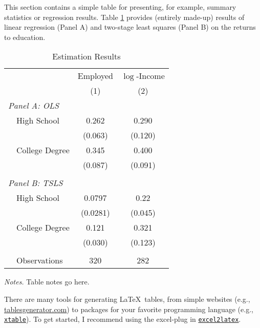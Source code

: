 This section contains a simple table for presenting, for example, summary statistics or regression results. Table \ref{pset1:tab_estres} provides (entirely made-up) results of linear regression (Panel A) and two-stage least squares (Panel B) on the returns to education. 

\begin{table}[!htbp] \small 
  \centering 
  \begin{threeparttable}
  \caption{Estimation Results}\label{pset1:tab_estres}
\begin{tabular}{llcc} \toprule \midrule 
      &       & Employed & $\log$-Income  \\ 
      &       & (1) & (2) \\ \midrule
\multicolumn{3}{l}{\textit{Panel A:  OLS}} \\
      & High School & 0.262 & 0.290 \\
      &       & (0.063) & (0.120) \\
      & College Degree & 0.345 & 0.400\\
      &       & (0.087) & (0.091) \\
      &       &          & \\
\multicolumn{3}{l}{\textit{Panel B:  TSLS}} \\
      & High School & 0.0797 & 0.22 \\
      &       & (0.0281) & (0.045) \\
      & College Degree & 0.121 & 0.321\\
      &       & (0.030) & (0.123) \\
      &       &          & \\
      &  Observations & 320 & 282 \\ \midrule \bottomrule
\end{tabular}%
  \begin{tablenotes}
  \footnotesize \item \textit{Notes.} Table notes go here.
  \end{tablenotes}
    \end{threeparttable}
\end{table}

There are many tools for generating \LaTeX \ tables, from simple websites (e.g., \href{https://www.tablesgenerator.com/}{\underline{tablesgenerator.com}}) to packages for your favorite programming language (e.g., \href{https://cran.r-project.org/web/packages/xtable/index.html}{\underline{\texttt{xtable}}}). To get started, I recommend using the excel-plug in \href{https://ctan.org/thttps://cran.r-project.org/web/packages/xtable/index.htmlex-archive/support/excel2latex?lang=en}{\underline{\texttt{excel2latex}}}. 

